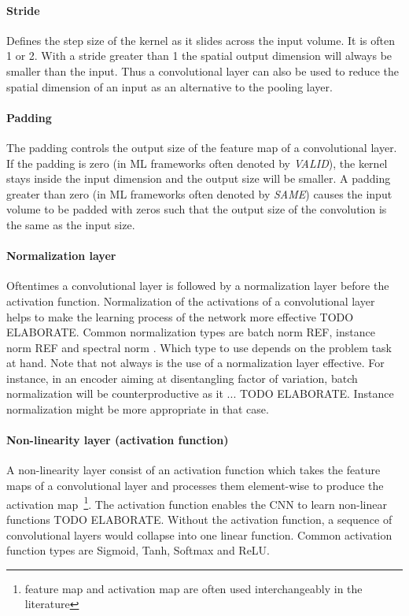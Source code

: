 \documentclass[12pt,a4paper]{article}
\begin{document}
\paragraph{Stride                   } Defines the step size of the kernel as it slides across the input volume. It is often 1 or 2. With a stride greater than 1 the spatial output dimension will always be smaller than the input. Thus a convolutional layer can also be used to reduce the spatial dimension of an input as an alternative to the pooling layer.

\paragraph{Padding					} The padding controls the output size of the feature map of a convolutional layer. If the padding is zero (in ML frameworks often denoted by \textit{VALID}), the kernel stays inside the input dimension and the output size will be smaller. A padding greater than zero (in ML frameworks often denoted by \textit{SAME}) causes the input volume to be padded with zeros such that the output size of the convolution is the same as the input size.

\paragraph{Normalization layer      } Oftentimes a convolutional layer is followed by a normalization layer before the activation function. Normalization of the activations of a convolutional layer helps to make the learning process of the network more effective TODO ELABORATE. Common normalization types are batch norm REF, instance norm REF and spectral norm \cite{SNGAN}. Which type to use depends on the problem task at hand. Note that not always is the use of a normalization layer effective. For instance, in an encoder aiming at disentangling factor of variation, batch normalization will be counterproductive as it ... TODO ELABORATE. Instance normalization might be more appropriate in that case.

\paragraph{Non-linearity layer (activation function)} A non-linearity layer consist of an activation function which takes the feature maps of a convolutional layer and processes them element-wise to produce the activation map~\footnote{feature map and activation map are often used interchangeably in the literature}. The activation function enables the CNN to learn non-linear functions TODO ELABORATE. Without the activation function, a sequence of convolutional layers would collapse into one linear function. Common activation function types are Sigmoid, Tanh, Softmax and ReLU. 
\end{document}
